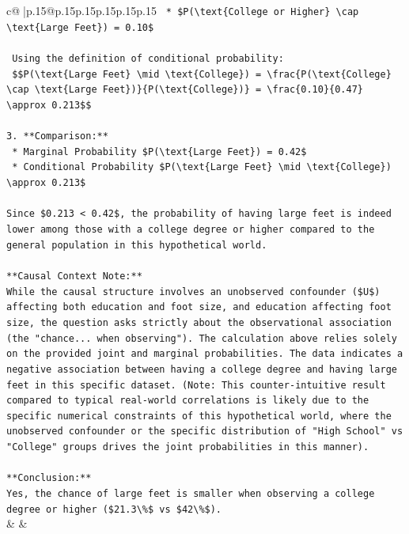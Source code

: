 \documentclass{article}
\begin{document}
{\begin{supertabular}{c@{$\;$}|p{.15\linewidth}@{}p{.15\linewidth}p{.15\linewidth}p{.15\linewidth}p{.15\linewidth}p{.15\linewidth}}
{{{\texttt{    *   \$P(\textbackslash{}text\{College or Higher\} \textbackslash{}cap \textbackslash{}text\{Large Feet\}) = 0.10\$} \\
\\ 
\texttt{    Using the definition of conditional probability:} \\
\texttt{    \$\$P(\textbackslash{}text\{Large Feet\} \textbackslash{}mid \textbackslash{}text\{College\}) = \textbackslash{}frac\{P(\textbackslash{}text\{College\} \textbackslash{}cap \textbackslash{}text\{Large Feet\})\}\{P(\textbackslash{}text\{College\})\} = \textbackslash{}frac\{0.10\}\{0.47\} \textbackslash{}approx 0.213\$\$} \\
\\ 
\texttt{3.  **Comparison:**} \\
\texttt{    *   Marginal Probability \$P(\textbackslash{}text\{Large Feet\}) = 0.42\$} \\
\texttt{    *   Conditional Probability \$P(\textbackslash{}text\{Large Feet\} \textbackslash{}mid \textbackslash{}text\{College\}) \textbackslash{}approx 0.213\$} \\
\\ 
\texttt{Since \$0.213 < 0.42\$, the probability of having large feet is indeed lower among those with a college degree or higher compared to the general population in this hypothetical world.} \\
\\ 
\texttt{**Causal Context Note:**} \\
\texttt{While the causal structure involves an unobserved confounder (\$U\$) affecting both education and foot size, and education affecting foot size, the question asks strictly about the observational association (the "chance... when observing"). The calculation above relies solely on the provided joint and marginal probabilities. The data indicates a negative association between having a college degree and having large feet in this specific dataset. (Note: This counter{-}intuitive result compared to typical real{-}world correlations is likely due to the specific numerical constraints of this hypothetical world, where the unobserved confounder or the specific distribution of "High School" vs "College" groups drives the joint probabilities in this manner).} \\
\\ 
\texttt{**Conclusion:**} \\
\texttt{Yes, the chance of large feet is smaller when observing a college degree or higher (\$21.3\textbackslash{}\%\$ vs \$42\textbackslash{}\%\$).} \\
            }
        }
    }
    & & \\ \\


\end{supertabular}}
\end{document}

